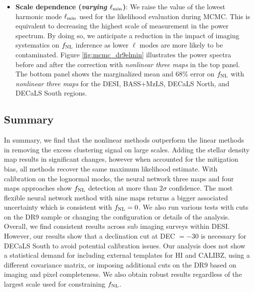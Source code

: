 \begin{itemize}[itemindent=*]
\item \textbf{Scale dependence (\textit{varying $\ell_{\rm min}$})}: We raise the value of the lowest harmonic mode $\ell_{\rm min}$ used for the likelihood evaluation during MCMC. This is equivalent to decreasing the highest scale of measurement in the power spectrum. By doing so, we anticipate a reduction in the impact of imaging systematics on $f_{\rm NL}$ inference as lower $\ell$ modes are more likely to be contaminated. Figure \ref{fig:mcmc_dr9elmin} illustrates the power spectra before and after the correction with \textit{nonlinear three maps} in the top panel. The bottom panel shows the marginalized mean and $68\%$ error on $f_{\rm NL}$ with \textit{nonlinear three maps} for the DESI, BASS+MzLS, DECaLS North, and DECaLS South regions.  

\end{itemize}

\subsection{Summary}
In summary, we find that the nonlinear methods outperform the linear methods in removing the excess clustering signal on large scales. Adding the stellar density map results in significant changes, however when accounted for the mitigation bias, all methods recover the same maximum likelihood estimate. With calibration on the lognormal mocks, the neural network three maps and four maps approaches show $f_{\rm NL}$ detection at more than $2\sigma$ confidence. The most flexible neural network method with nine maps returns a bigger associated uncertainty which is consistent with $f_{\rm NL}=0$. We also run various tests with cuts on the DR9 sample or changing the configuration or details of the analysis. Overall, we find consistent results across sub imaging surveys within DESI. However, our results show that a declination cut at DEC $=-30$ is necessary for DECaLS South to avoid potential calibration issues. Our analysis does not show a statistical demand for including external templates for HI and CALIBZ, using a different covariance matrix, or imposing additional cuts on the DR9 based on imaging and pixel completeness. We also obtain robust results regardless of the largest scale used for constraining $f_{\rm NL}$.
